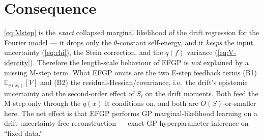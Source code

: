 \documentclass[11pt]{article}
\newcommand{\Eqx}{\mathbb{E}_{q(x_i)}}
\begin{document}
\section{Consequence}
\eqref{eq:Mstep} is the \emph{exact} collapsed marginal likelihood of the drift
regression for the Fourier model --- it drops only the $\theta$-constant self-energy,
and it \emph{keeps} the input uncertainty (\ref{eq:chi}), the Stein correction, and the
$q(f)$ variance (\ref{eq:V-identity}). Therefore the length-scale behaviour of EFGP is
\emph{not} explained by a missing M-step term. What EFGP omits are the two E-step
feedback terms (B1) $\Eqx[V]$ and (B2) the residual-Hessian/covariance, i.e.\ the
drift's epistemic uncertainty and the second-order effect of $S_i$ on the drift
moments. Both feed the M-step only through the $q(x)$ it conditions on, and both are
$O(S)$-or-smaller here. The net effect is that EFGP performs GP marginal-likelihood
learning on a drift-uncertainty-free reconstruction --- exact GP hyperparameter
inference on ``fixed data.''
\end{document}
